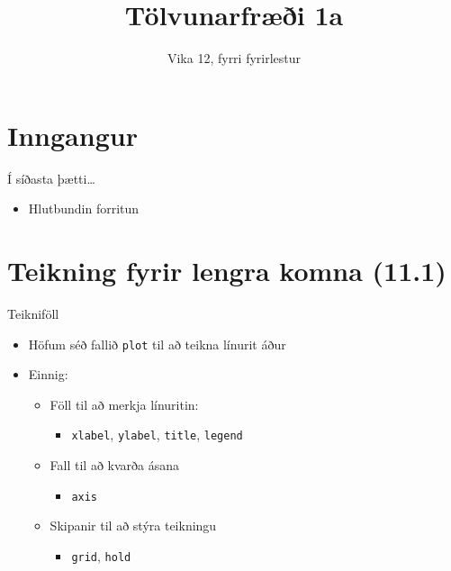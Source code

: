 \documentclass{beamer}
\title{Tölvunarfræði 1a}
\subtitle{Vika 12, fyrri fyrirlestur}
\begin{document}
\begin{frame}
\titlepage
\end{frame}

\section{Inngangur}

\begin{frame}{Í síðasta þætti\ldots}
\begin{itemize}
 \item Hlutbundin forritun
\end{itemize}
\end{frame}

\section{Teikning fyrir lengra komna (11.1)}

\begin{frame}{Teikniföll}
\begin{itemize}
 \item Höfum séð fallið \texttt{plot} til að teikna línurit áður
 \item Einnig:
 \begin{itemize}
  \item Föll til að merkja línuritin:
  \begin{itemize}
   \item \texttt{xlabel}, \texttt{ylabel}, \texttt{title}, \texttt{legend}
  \end{itemize}
  \item Fall til að kvarða ásana
  \begin{itemize}
   \item \texttt{axis}
  \end{itemize}
  \item Skipanir til að stýra teikningu
  \begin{itemize}
   \item \texttt{grid}, \texttt{hold}
  \end{itemize}
 \end{itemize}
\end{itemize}
\end{frame}
\end{document}

